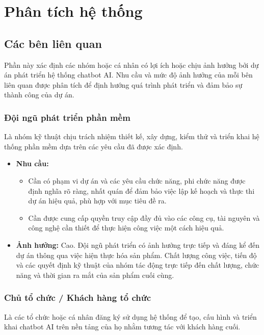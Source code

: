 \newpage
\section{Phân tích hệ thống}

\subsection{Các bên liên quan}

Phần này xác định các nhóm hoặc cá nhân có lợi ích hoặc chịu ảnh hưởng bởi dự án phát triển hệ thống chatbot AI. Nhu cầu và mức độ ảnh hưởng của mỗi bên liên quan được phân tích để định hướng quá trình phát triển và đảm bảo sự thành công của dự án.

\subsubsection{Đội ngũ phát triển phần mềm}

Là nhóm kỹ thuật chịu trách nhiệm thiết kế, xây dựng, kiểm thử và triển khai hệ thống phần mềm dựa trên các yêu cầu đã được xác định.

\begin{itemize}
    \item \textbf{Nhu cầu:}
    \begin{itemize}
        \item Cần có phạm vi dự án và các yêu cầu chức năng, phi chức năng được định nghĩa rõ ràng, nhất quán để đảm bảo việc lập kế hoạch và thực thi dự án hiệu quả, phù hợp với mục tiêu đề ra.
        \item Cần được cung cấp quyền truy cập đầy đủ vào các công cụ, tài nguyên và công nghệ cần thiết để thực hiện công việc một cách hiệu quả.
    \end{itemize}
    \item \textbf{Ảnh hưởng:} Cao. Đội ngũ phát triển có ảnh hưởng trực tiếp và đáng kể đến dự án thông qua việc hiện thực hóa sản phẩm. Chất lượng công việc, tiến độ và các quyết định kỹ thuật của nhóm tác động trực tiếp đến chất lượng, chức năng và thời gian ra mắt của sản phẩm cuối cùng.
\end{itemize}

\subsubsection{Chủ tổ chức / Khách hàng tổ chức}

Là các tổ chức hoặc cá nhân đăng ký sử dụng hệ thống để tạo, cấu hình và triển khai chatbot AI trên nền tảng của họ nhằm tương tác với khách hàng cuối.

